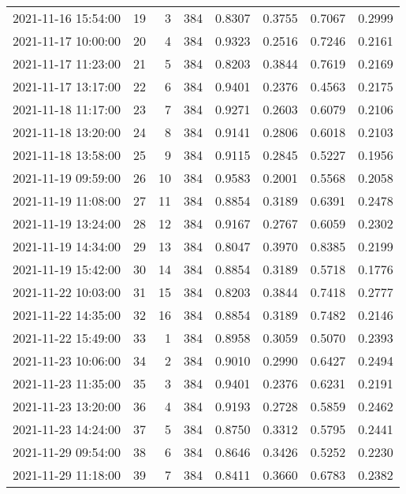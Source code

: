 \begin{table}
\begin{tabular}{lrrrrrrr}
2021-11-16 15:54:00 &   19 &    3 &    384 &   0.8307 & 0.3755 & 0.7067 & 0.2999 \\
2021-11-17 10:00:00 &   20 &    4 &    384 &   0.9323 & 0.2516 & 0.7246 & 0.2161 \\
2021-11-17 11:23:00 &   21 &    5 &    384 &   0.8203 & 0.3844 & 0.7619 & 0.2169 \\
2021-11-17 13:17:00 &   22 &    6 &    384 &   0.9401 & 0.2376 & 0.4563 & 0.2175 \\
2021-11-18 11:17:00 &   23 &    7 &    384 &   0.9271 & 0.2603 & 0.6079 & 0.2106 \\
2021-11-18 13:20:00 &   24 &    8 &    384 &   0.9141 & 0.2806 & 0.6018 & 0.2103 \\
2021-11-18 13:58:00 &   25 &    9 &    384 &   0.9115 & 0.2845 & 0.5227 & 0.1956 \\
2021-11-19 09:59:00 &   26 &   10 &    384 &   0.9583 & 0.2001 & 0.5568 & 0.2058 \\
2021-11-19 11:08:00 &   27 &   11 &    384 &   0.8854 & 0.3189 & 0.6391 & 0.2478 \\
2021-11-19 13:24:00 &   28 &   12 &    384 &   0.9167 & 0.2767 & 0.6059 & 0.2302 \\
2021-11-19 14:34:00 &   29 &   13 &    384 &   0.8047 & 0.3970 & 0.8385 & 0.2199 \\
2021-11-19 15:42:00 &   30 &   14 &    384 &   0.8854 & 0.3189 & 0.5718 & 0.1776 \\
2021-11-22 10:03:00 &   31 &   15 &    384 &   0.8203 & 0.3844 & 0.7418 & 0.2777 \\
2021-11-22 14:35:00 &   32 &   16 &    384 &   0.8854 & 0.3189 & 0.7482 & 0.2146 \\
2021-11-22 15:49:00 &   33 &    1 &    384 &   0.8958 & 0.3059 & 0.5070 & 0.2393 \\
2021-11-23 10:06:00 &   34 &    2 &    384 &   0.9010 & 0.2990 & 0.6427 & 0.2494 \\
2021-11-23 11:35:00 &   35 &    3 &    384 &   0.9401 & 0.2376 & 0.6231 & 0.2191 \\
2021-11-23 13:20:00 &   36 &    4 &    384 &   0.9193 & 0.2728 & 0.5859 & 0.2462 \\
2021-11-23 14:24:00 &   37 &    5 &    384 &   0.8750 & 0.3312 & 0.5795 & 0.2441 \\
2021-11-29 09:54:00 &   38 &    6 &    384 &   0.8646 & 0.3426 & 0.5252 & 0.2230 \\
2021-11-29 11:18:00 &   39 &    7 &    384 &   0.8411 & 0.3660 & 0.6783 & 0.2382 \\

\end{tabular}
\end{table}

